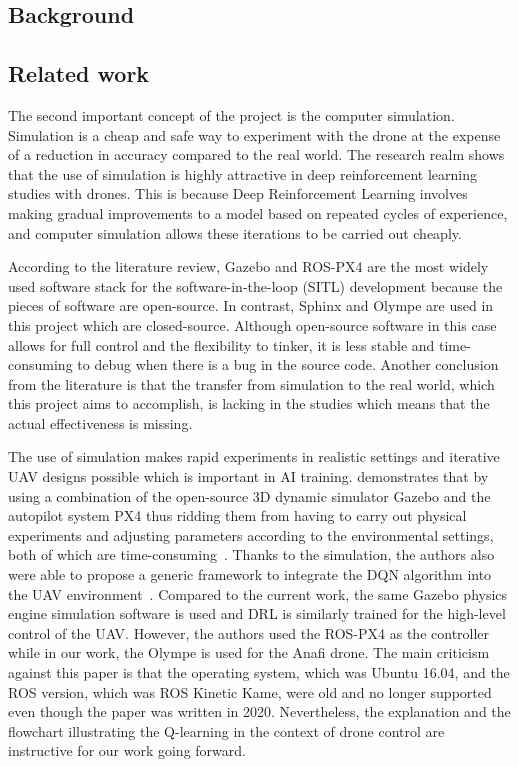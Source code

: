 \documentclass[../main.tex]{subfiles}
\begin{document}
\subsection{Background}

\blindtext

\subsection{Related work}



The second important concept of the project is the computer simulation.
Simulation is a cheap and safe way to experiment with the drone
at the expense of a reduction in accuracy compared to the real world.
The research realm shows that the use of simulation is highly attractive
in deep reinforcement learning studies with drones.
This is because Deep Reinforcement Learning involves
making gradual improvements to a model based on 
repeated cycles of experience, and computer simulation 
allows these iterations to be carried out cheaply.

According to the literature review, 
Gazebo and ROS-PX4 are the most widely used software stack 
for the software-in-the-loop (\textsc{SITL}) development
because the pieces of software are open-source. 
In contrast, Sphinx and Olympe are used in this project 
which are closed-source.
Although open-source software in this case 
allows for full control and the flexibility to tinker,
it is less stable and time-consuming to debug
when there is a bug in the source code.
Another conclusion from the literature is that 
the transfer from simulation to the real world,
which this project aims to accomplish,
is lacking in the studies 
which means that the actual effectiveness is missing.

The use of simulation makes rapid experiments in realistic settings 
and iterative UAV designs possible which is important in AI training. 
\citeauthor{Zho20} demonstrates that by %
using a combination of the open-source 3D dynamic simulator Gazebo
and the autopilot system PX4
thus ridding them from having to carry out physical experiments
and adjusting parameters according to the environmental settings,
both of which are time-consuming~\cite{Zho20}.
Thanks to the simulation, 
the authors also were able to propose a generic
framework to integrate the DQN algorithm into 
the UAV environment~\cite{Zho20}.
Compared to the current work, the same Gazebo physics engine
simulation software is used and DRL is similarly trained
for the high-level control of the UAV. 
However, the authors used the ROS-PX4 as the controller 
while in our work, the Olympe is used for the Anafi drone.
The main criticism against this paper is that the operating system,
which was Ubuntu 16.04, and 
the ROS version, which was ROS Kinetic Kame, 
were old and no longer supported 
even though the paper was written in 2020.
Nevertheless, the explanation and the flowchart illustrating the 
Q-learning in the context of drone control are instructive 
for our work going forward.
\end{document}
